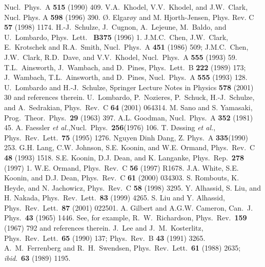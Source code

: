 \documentclass{elsart}
\begin{document}
\begin{thebibliography}{99}
  Nucl.\ Phys.\ A {\bf 515} (1990) 409.
  V.A.\ Khodel, V.V.\ Khodel, and J.W.\ Clark,
  Nucl. Phys. A {\bf 598} (1996) 390.
  \O. Elgar\o y and M. Hjorth-Jensen,
  Phys. Rev.  C {\bf 57} (1998) 1174. 
  H.-J.\ Schulze, J.\ Cugnon, A.\ Lejeune, M.\ Baldo, 
  and U.\ Lombardo, 
  Phys.\ Lett.\  { \bf B375} (1996) 1. 
  J.M.C.\ Chen, J.W.\ Clark, E.\ Krotschek and R.A.\ Smith,
  Nucl.\ Phys.\ A {\bf 451} (1986) 509;
  J.M.C.\ Chen, J.W.\ Clark, R.D.\ Dave, and V.V.\ Khodel,
  Nucl.\ Phys.\ A {\bf 555} (1993) 59.
  T.L.\ Ainsworth, J.\ Wambach, and D.\ Pines,
  Phys.\ Lett.\ B {\bf 222} (1989) 173;
  J.\ Wambach, T.L.\ Ainsworth, and D.\ Pines,
  Nucl.\ Phys.\ A {\bf 555} (1993) 128.
 U.\ Lombardo and H.-J.\ Schulze, Springer Lecture Notes in Physics {\bf 578} (2001) 30 and references therein.
 U.\ Lombardo, P.\ Nozieres, P.\ Schuck, H.-J.\ Schulze,
and A.\ Sedrakian, Phys.\ Rev.\ C {\bf 64}  (2001) 064314.
M. Sano and S. Yamasaki, 
Prog.\ Theor.\ Phys.\ {\bf 29} (1963) 397. 
A.L. Goodman, Nucl.\ Phys.\ A {\bf 352} (1981)  45.
A. Faessler {\sl et al.},Nucl.\ Phys.\ {\bf 256}(1976) 106. 
T. D{\o}ssing {\sl et al.}, 
Phys.\ Rev.\ Lett.\ {\bf 75}  (1995) 1276.  
Nguyen Dinh Dang, Z. Phys.\ A {\bf 335}(1990) 253.
G.H. Lang, C.W. Johnson, S.E. Koonin, and W.E. Ormand, 
Phys.\ Rev.\ C {\bf 48} (1993) 1518.
S.E. Koonin, D.J. Dean, and K. Langanke, 
Phys.\ Rep.\ {\bf 278} (1997) 1. 
W.E. Ormand, Phys.\ Rev.\ C {\bf 56} (1997) R1678.
J.A. White, S.E. Koonin, and D.J. Dean, 
Phys.\ Rev.\ C {\bf 61} (2000) 034303. 
S. Rombouts, K. Heyde, and N. Jachowicz, 
Phys.\ Rev.\ C {\bf 58} (1998) 3295.
Y. Alhassid, S. Liu, and H. Nakada, 
Phys.\ Rev.\ Lett.\ {\bf 83} (1999) 4265.
 S. Liu and Y. Alhassid, 
Phys.\ Rev.\ Lett.\ {\bf 87} (2001) 022501.
A. Gilbert and A.G.W. Cameron, 
Can.\ J. Phys.\ {\bf 43} (1965) 1446.
 See, for example, R.~W.~Richardson, 
Phys.~Rev.~{\bf 159} (1967) 792 and references therein.
 J.~Lee and J.~M.~Kosterlitz, 
Phys.~Rev.~Lett.~{\bf 65} (1990) 137;
Phys.~Rev.~B {\bf 43} (1991) 3265.
 A.~M.~Ferrenberg and R.~H.~Swendsen, 
Phys.~Rev.~Lett.~{\bf 61} (1988) 2635; 
{\em ibid}.~{\bf 63} (1989) 1195.
\end{thebibliography}
\end{document}
